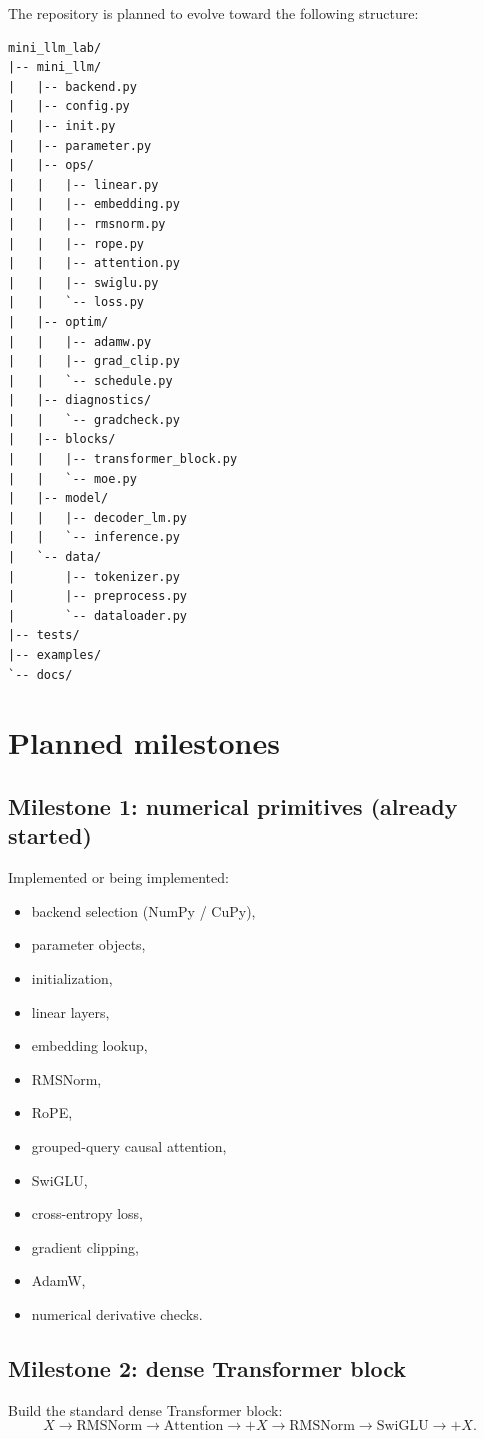 \documentclass[11pt]{article}
\begin{document}
The repository is planned to evolve toward the following structure:

\begin{verbatim}
mini_llm_lab/
|-- mini_llm/
|   |-- backend.py
|   |-- config.py
|   |-- init.py
|   |-- parameter.py
|   |-- ops/
|   |   |-- linear.py
|   |   |-- embedding.py
|   |   |-- rmsnorm.py
|   |   |-- rope.py
|   |   |-- attention.py
|   |   |-- swiglu.py
|   |   `-- loss.py
|   |-- optim/
|   |   |-- adamw.py
|   |   |-- grad_clip.py
|   |   `-- schedule.py
|   |-- diagnostics/
|   |   `-- gradcheck.py
|   |-- blocks/
|   |   |-- transformer_block.py
|   |   `-- moe.py
|   |-- model/
|   |   |-- decoder_lm.py
|   |   `-- inference.py
|   `-- data/
|       |-- tokenizer.py
|       |-- preprocess.py
|       `-- dataloader.py
|-- tests/
|-- examples/
`-- docs/
\end{verbatim}

\section{Planned milestones}

\subsection*{Milestone 1: numerical primitives (already started)}
Implemented or being implemented:
\begin{itemize}[leftmargin=1.5em]
    \item backend selection (NumPy / CuPy),
    \item parameter objects,
    \item initialization,
    \item linear layers,
    \item embedding lookup,
    \item RMSNorm,
    \item RoPE,
    \item grouped-query causal attention,
    \item SwiGLU,
    \item cross-entropy loss,
    \item gradient clipping,
    \item AdamW,
    \item numerical derivative checks.
\end{itemize}

\subsection*{Milestone 2: dense Transformer block}
Build the standard dense Transformer block:
\[
X \rightarrow \text{RMSNorm} \rightarrow \text{Attention} \rightarrow +X
\rightarrow \text{RMSNorm} \rightarrow \text{SwiGLU} \rightarrow +X.
\]
\end{document}

